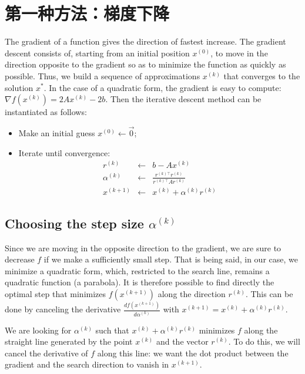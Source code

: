 \documentclass[notitlepage,oneside]{book}
\begin{document}
\newpage

\section{第一种方法：梯度下降}
\label{chap5:sec:linalg:descente_gradient}

The gradient of a function gives the direction of fastest increase.
The gradient descent consists of, starting from an initial position $x^{(0)}$,
to move in the direction opposite to the gradient so as to minimize the function as quickly as possible.
Thus, we build a sequence of approximations $x^{(k)}$ that converges to the solution $x^*$.
In the case of a quadratic form, the gradient is easy to compute: $\nabla f(x^{(k)}) = 2Ax^{(k)} - 2b$.
Then the iterative descent method can be instantiated as follows:

\begin{framed}
\begin{itemize}
\setlength\parsep{0pt}
\setlength\itemsep{0pt}
\setlength{\parskip}{0pt}
\setlength{\topsep}{0pt}
\setlength{\partopsep}{0pt}
\item Make an initial guess $x^{(0)} \leftarrow \vec{0} $;
\item Iterate until convergence:
\begin{eqnarray*}
  r^{(k)} &\leftarrow& b -Ax^{(k)}\\
  \alpha^{(k)} &\leftarrow& \frac{r^{(k)\top}r^{(k)}}{r^{(k)\top}Ar^{(k)}}\\
  x^{(k+1)} &\leftarrow& x^{(k)}+\alpha^{(k)} r^{(k)}
\end{eqnarray*}
\end{itemize}
\end{framed}


\subsection{Choosing the step size $\alpha^{(k)}$}
Since we are moving in the opposite direction to the gradient, we are sure to decrease $f$ if we make a sufficiently small step.
That is being said, in our case, we minimize a quadratic form, which, restricted to the search line, remains a quadratic function (a parabola).
It is therefore possible to find directly the optimal step that minimizes $f(x^{(k+1)})$ along the direction $r^{(k)}$.
This can be done by canceling the derivative $\frac{df\left(x^{(k+1)}\right)}{d\alpha^{(k)}}$ with $x^{(k+1)}=x^{(k)}+\alpha^{(k)} r^{(k)}$.

We are looking for $\alpha^{(k)}$ such that $x^{(k)}+\alpha^{(k)} r^{(k)}$ minimizes $f$ along the straight line
generated by the point $x^{(k)}$ and the vector $r^{(k)}$.
To do this, we will cancel the derivative of $f$ along this line:
we want the dot product between the gradient and the search direction to vanish in $x^{(k+1)}$.
\end{document}
